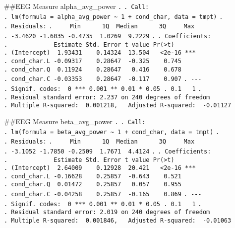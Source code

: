 \documentclass[
]{article}
\begin{document}
\#\#EEG Measure alpha\_avg\_power \texttt{.} \texttt{.\ Call:}
\texttt{.\ lm(formula\ =\ alpha\_avg\_power\ \textasciitilde{}\ 1\ +\ cond\_char,\ data\ =\ tmpt)}
\texttt{.} \texttt{.\ Residuals:}
\texttt{.\ \ \ \ \ Min\ \ \ \ \ \ 1Q\ \ Median\ \ \ \ \ \ 3Q\ \ \ \ \ Max}
\texttt{.\ -3.4620\ -1.6035\ -0.4735\ \ 1.0269\ \ 9.2229} \texttt{.}
\texttt{.\ Coefficients:}
\texttt{.\ \ \ \ \ \ \ \ \ \ \ \ \ Estimate\ Std.\ Error\ t\ value\ Pr(\textgreater{}\textbar{}t\textbar{})}
\texttt{.\ (Intercept)\ \ 1.93431\ \ \ \ 0.14324\ \ 13.504\ \ \ \textless{}2e-16\ ***}
\texttt{.\ cond\_char.L\ -0.09317\ \ \ \ 0.28647\ \ -0.325\ \ \ \ 0.745}
\texttt{.\ cond\_char.Q\ \ 0.11924\ \ \ \ 0.28647\ \ \ 0.416\ \ \ \ 0.678}
\texttt{.\ cond\_char.C\ -0.03353\ \ \ \ 0.28647\ \ -0.117\ \ \ \ 0.907}
\texttt{.\ -\/-\/-}
\texttt{.\ Signif.\ codes:\ \ 0\ \textquotesingle{}***\textquotesingle{}\ 0.001\ \textquotesingle{}**\textquotesingle{}\ 0.01\ \textquotesingle{}*\textquotesingle{}\ 0.05\ \textquotesingle{}.\textquotesingle{}\ 0.1\ \textquotesingle{}\ \textquotesingle{}\ 1}
\texttt{.}
\texttt{.\ Residual\ standard\ error:\ 2.237\ on\ 240\ degrees\ of\ freedom}
\texttt{.\ Multiple\ R-squared:\ \ 0.001218,\ \ \ Adjusted\ R-squared:\ \ -0.01127}

\#\#EEG Measure beta\_avg\_power \texttt{.} \texttt{.\ Call:}
\texttt{.\ lm(formula\ =\ beta\_avg\_power\ \textasciitilde{}\ 1\ +\ cond\_char,\ data\ =\ tmpt)}
\texttt{.} \texttt{.\ Residuals:}
\texttt{.\ \ \ \ \ Min\ \ \ \ \ \ 1Q\ \ Median\ \ \ \ \ \ 3Q\ \ \ \ \ Max}
\texttt{.\ -3.1052\ -1.7850\ -0.2509\ \ 1.7671\ \ 4.4124} \texttt{.}
\texttt{.\ Coefficients:}
\texttt{.\ \ \ \ \ \ \ \ \ \ \ \ \ Estimate\ Std.\ Error\ t\ value\ Pr(\textgreater{}\textbar{}t\textbar{})}
\texttt{.\ (Intercept)\ \ 2.64009\ \ \ \ 0.12928\ \ 20.421\ \ \ \textless{}2e-16\ ***}
\texttt{.\ cond\_char.L\ -0.16628\ \ \ \ 0.25857\ \ -0.643\ \ \ \ 0.521}
\texttt{.\ cond\_char.Q\ \ 0.01472\ \ \ \ 0.25857\ \ \ 0.057\ \ \ \ 0.955}
\texttt{.\ cond\_char.C\ -0.04258\ \ \ \ 0.25857\ \ -0.165\ \ \ \ 0.869}
\texttt{.\ -\/-\/-}
\texttt{.\ Signif.\ codes:\ \ 0\ \textquotesingle{}***\textquotesingle{}\ 0.001\ \textquotesingle{}**\textquotesingle{}\ 0.01\ \textquotesingle{}*\textquotesingle{}\ 0.05\ \textquotesingle{}.\textquotesingle{}\ 0.1\ \textquotesingle{}\ \textquotesingle{}\ 1}
\texttt{.}
\texttt{.\ Residual\ standard\ error:\ 2.019\ on\ 240\ degrees\ of\ freedom}
\texttt{.\ Multiple\ R-squared:\ \ 0.001846,\ \ \ Adjusted\ R-squared:\ \ -0.01063}
\end{document}
